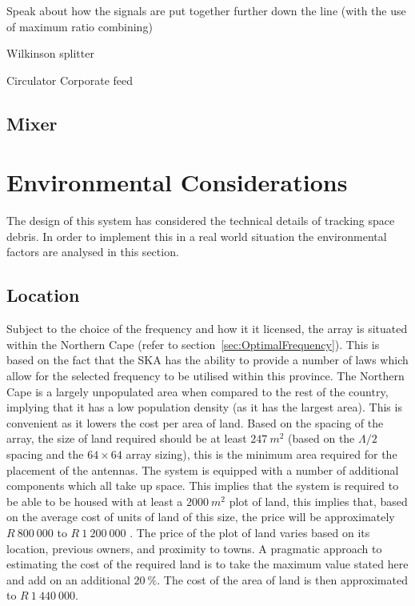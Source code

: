\documentclass[11pt]{witseiepaper}
\begin{document}
Speak about how the signals are put together further down the line (with the use of maximum ratio combining)

Wilkinson splitter

Circulator
Corporate feed

\subsection{Mixer} \label{sec:Mixer}


\section{Environmental Considerations} \label{sec:EnvironmentalConsiderations}
The design of this system has considered the technical details of tracking space debris. In order to implement this in a real world situation the environmental factors are analysed in this section.

\subsection{Location} \label{sec:Location}
Subject to the choice of the frequency and how it it licensed, the array is situated within the Northern Cape (refer to section~\ref{sec:OptimalFrequency}). This is based on the fact that the SKA has the ability to provide a number of laws which allow for the selected frequency to be utilised within this province.
The Northern Cape is a largely unpopulated area when compared to the rest of the country, implying that it has a low population density (as it has the largest area). This is convenient as it lowers the cost per area of land. 
Based on the spacing of the array, the size of land required should be at least $247~m^2$ (based on the $\Lambda/2$ spacing and the $64 \times 64$ array sizing), this is the minimum area required for the placement of the antennas. The system is equipped with a number of additional components which all take up space.
This implies that the system is required to be able to be housed with at least a $2000~m^2$ plot of land, this implies that, based on the average cost of units of land of this size, the price will be approximately $R~800~000$ to $R~1~200~000$ \cite{LocationPrice1, LocationPrice2, LocationPrice3}.
The price of the plot of land varies based on its location, previous owners, and proximity to towns. A pragmatic approach to estimating the cost of the required land is to take the maximum value stated here and add on an additional $20~\%$. The cost of the area of land is then approximated to $R~1~440~000$.
\end{document}
